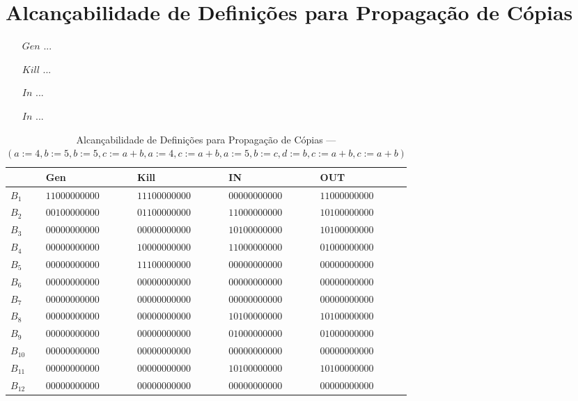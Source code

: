 \section{Alcan\c{c}abilidade de Defini\c{c}\~oes para Propaga\c{c}\~ao de C\'opias}

\begin{itemize}
  \item[$Gen$] ...
  \item[$Kill$] ...
  \item[$In$] ...
  \item[$In$] ...
\end{itemize}

\begin{table}[ht]
\centering
\begin{tabular}{l|l|l|l|l}
	& Gen & Kill & IN & OUT\\
\hline
$B_{1}$ &  $11000000000$ & $11100000000$ & $00000000000$ & $11000000000$\\
$B_{2}$ &  $00100000000$ & $01100000000$ & $11000000000$ & $10100000000$\\
$B_{3}$ &  $00000000000$ & $00000000000$ & $10100000000$ & $10100000000$\\
$B_{4}$ &  $00000000000$ & $10000000000$ & $11000000000$ & $01000000000$\\
$B_{5}$ &  $00000000000$ & $11100000000$ & $00000000000$ & $00000000000$\\
$B_{6}$ &  $00000000000$ & $00000000000$ & $00000000000$ & $00000000000$\\
$B_{7}$ &  $00000000000$ & $00000000000$ & $00000000000$ & $00000000000$\\
$B_{8}$ &  $00000000000$ & $00000000000$ & $10100000000$ & $10100000000$\\
$B_{9}$ &  $00000000000$ & $00000000000$ & $01000000000$ & $01000000000$\\
$B_{10}$ &  $00000000000$ & $00000000000$ & $00000000000$ & $00000000000$\\
$B_{11}$ &  $00000000000$ & $00000000000$ & $10100000000$ & $10100000000$\\
$B_{12}$ &  $00000000000$ & $00000000000$ & $00000000000$ & $00000000000$\\
\end{tabular}
\caption{Alcan\c{c}abilidade de Defini\c{c}\~oes para Propaga\c{c}\~ao de C\'opias --- $(a:=4, b:=5, b:=5, c:=a+b, a:=4, c:=a+b, a:=5, b:=c, d:=b, c:=a+b, c:=a+b)$}
\end{table}

